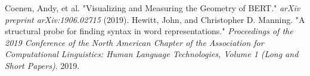\documentclass[12pt]{article}
\begin{document}
\begin{thebibliography}{9}
Coenen, Andy, et al. "Visualizing and Measuring the Geometry of BERT." \emph{arXiv preprint arXiv:1906.02715} (2019).
\vspace{-0.25cm}
Hewitt, John, and Christopher D. Manning. "A structural probe for finding syntax in word representations." \emph{Proceedings of the 2019 Conference of the North American Chapter of the Association for Computational Linguistics: Human Language Technologies, Volume 1 (Long and Short Papers)}. 2019.

\end{thebibliography}
 
\end{document}

